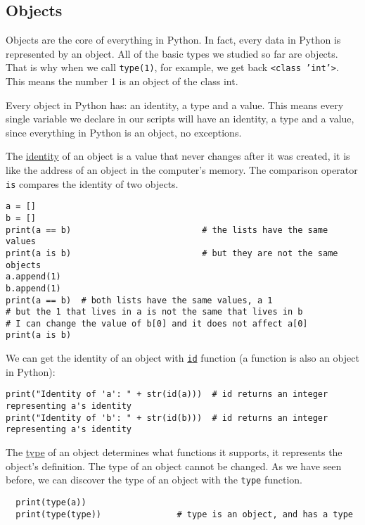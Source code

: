 \documentclass[12pt, a4paper]{article}
\begin{document}
\subsection{Objects}
\label{sec:orgf82b017}
Objects are the core of everything in Python. In fact, every data in Python is represented by an object. All of the basic types we studied so far are objects. That is why when we call \texttt{type(1)}, for example, we get back \texttt{<class 'int'>}. This means the number 1 is an object of the class int.

Every object in Python has: an identity, a type and a value.
This means every single variable we declare in our scripts will have an identity, a type and a value, since everything in Python is an object, no exceptions.

The \uline{identity} of an object is a value that never changes after it was created, it is like the address of an object in the computer's memory.
The comparison operator \texttt{is} compares the identity of two objects.
\lstset{language=jupyter-python,label= ,caption= ,captionpos=b,numbers=none}
\begin{lstlisting}
a = []
b = []
print(a == b)                          # the lists have the same values
print(a is b)                          # but they are not the same objects
a.append(1)
b.append(1)
print(a == b)  # both lists have the same values, a 1
# but the 1 that lives in a is not the same that lives in b
# I can change the value of b[0] and it does not affect a[0]
print(a is b)
\end{lstlisting}

We can get the identity of an object with \href{https://docs.python.org/3.6/library/functions.html?\#id}{\texttt{id}} function (a function is also an object in Python):
\lstset{language=jupyter-python,label= ,caption= ,captionpos=b,numbers=none}
\begin{lstlisting}
print("Identity of 'a': " + str(id(a)))  # id returns an integer representing a's identity
print("Identity of 'b': " + str(id(b)))  # id returns an integer representing a's identity
\end{lstlisting}

The \uline{type} of an object determines what functions it supports, it represents the object's definition. The type of an object cannot be changed. As we have seen before, we can discover the type of an object with the \texttt{type} function.
\lstset{language=Python,label= ,caption= ,captionpos=b,numbers=none}
\begin{lstlisting}
  print(type(a))
  print(type(type))               # type is an object, and has a type
\end{lstlisting}
\end{document}
